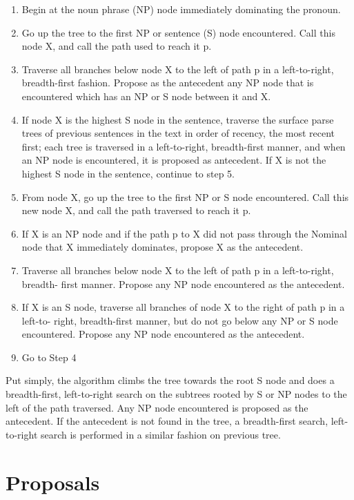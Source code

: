 \documentclass[11pt]{article}
\begin{document}
\begin{enumerate}
\item Begin at the noun phrase (NP) node immediately dominating the pronoun.
\item Go up the tree to the first NP or sentence (S) node encountered. Call this node X, and call the path used to reach it p.
\item Traverse all branches below node X to the left of path p in a left-to-right, breadth-first fashion. Propose as the antecedent any NP node that is encountered which has an NP or S node between it and X.
\item If node X is the highest S node in the sentence, traverse the surface parse trees of previous sentences in the text in order of recency, the most recent first; each tree is traversed in a left-to-right, breadth-first manner, and when an NP node is encountered, it is proposed as antecedent. If X is not the highest S node in the sentence, continue to step 5.
\item From node X, go up the tree to the first NP or S node encountered. Call this new node X, and call the path traversed to reach it p.
\item If X is an NP node and if the path p to X did not pass through the Nominal node that X immediately dominates, propose X as the antecedent.
\item Traverse all branches below node X to the left of path p in a left-to-right, breadth- first manner. Propose any NP node encountered as the antecedent.
\item If X is an S node, traverse all branches of node X to the right of path p in a left-to- right, breadth-first manner, but do not go below any NP or S node encountered. Propose any NP node encountered as the antecedent.
\item Go to Step 4
\end{enumerate}

Put simply, the algorithm climbs the tree towards the root S node and does a breadth-first, left-to-right search on the subtrees rooted by S or NP nodes to the left of the path traversed. Any NP node encountered is proposed as the antecedent. If the antecedent is not found in the tree, a breadth-first search, left-to-right search is performed in a similar fashion on previous tree. 

\section{Proposals}
\end{document}
